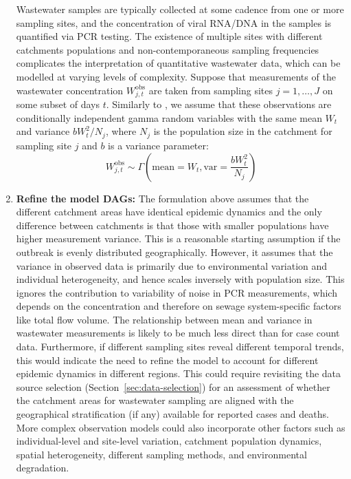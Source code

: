 \documentclass{article}
\begin{document}
\begin{enumerate}
   Wastewater samples are typically collected at some cadence from one or more sampling sites, and the concentration of viral RNA/DNA in the samples is quantified via PCR testing. The existence of multiple sites with different catchments populations and non-contemporaneous sampling frequencies complicates the interpretation of quantitative wastewater data, which can be modelled at varying levels of complexity.   
   Suppose that measurements of the wastewater concentration $W^\mathrm{obs}_{j,t}$ are taken from sampling sites $j=1,\ldots, J$ on some subset of days $t$. Similarly to \citep{watson2024jointly}, we assume that these observations are conditionally independent gamma random variables with the same mean $W_t$ and variance $b W_t^2/N_j$, where $N_j$ is the population size in the catchment for sampling site $j$ and $b$ is a variance parameter:
    \begin{equation}
        W^\mathrm{obs}_{j,t} \sim \Gamma\left(\mathrm{mean}= W_t,  \mathrm{var}=\frac{b W_t^2}{N_j} \right)
    \end{equation}

       
\item \textbf{Refine the model DAGs:}  The formulation above assumes that the different catchment areas have identical epidemic dynamics and the only difference between catchments is that those with smaller populations have higher measurement variance. This is a reasonable starting assumption if the outbreak is evenly distributed geographically. However, it assumes that the variance in observed data is primarily due to environmental variation and individual heterogeneity, and hence scales inversely with population size. This ignores the contribution to variability of noise in PCR measurements, which depends on the concentration and therefore on sewage system-specific factors like total flow volume. The relationship between mean and variance in wastewater measurements is likely to be much less direct than for case count data. Furthermore, if different sampling sites reveal different temporal trends, this would indicate the need to refine the model to account for different epidemic dynamics in different regions. This could require revisiting the data source selection (Section~\ref{sec:data-selection}) for an assessment of whether the catchment areas for wastewater sampling are aligned with the geographical stratification (if any) available for reported cases and deaths. More complex observation models could also incorporate other factors such as individual-level and site-level variation, catchment population dynamics, spatial heterogeneity, different sampling methods, and environmental degradation.


\end{enumerate}
\end{document}
